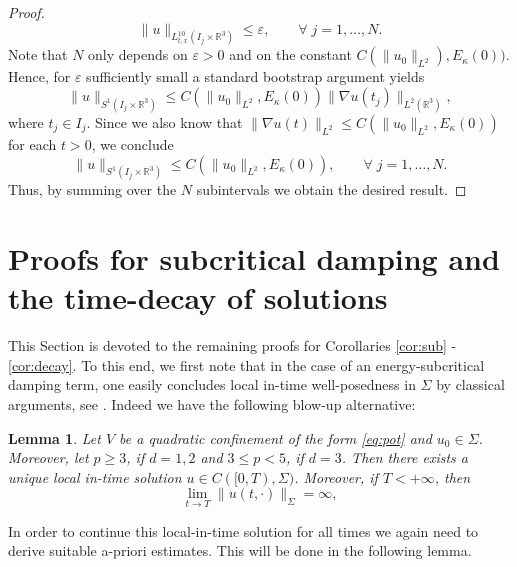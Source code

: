 \documentclass[a4paper,leqno]{amsart}
\theoremstyle{plain}
\newtheorem{lemma}[theorem]{Lemma}
\theoremstyle{definition}
\numberwithin{equation}{section}
\begin{document}
\begin{proof}
\begin{equation*}
\|u\|_{L^{10}_{t, x}(I_j\times{{\mathbb R}}^3)}{\leqslant}{\varepsilon},\qquad\forall\;j=1,\dotsc, N.
\end{equation*}
Note that $N$ only depends on ${\varepsilon}>0$ and on the constant $C(\|u_0\|_{L^2}), E_\kappa(0))$. Hence, for ${\varepsilon}$ sufficiently small a standard bootstrap argument yields 
\begin{equation*}
\|u\|_{S^1(I_j\times{{\mathbb R}}^3)}{\leqslant} C(\|u_0\|_{L^2}, E_\kappa(0))\|\nabla u(t_j)\|_{L^2({{\mathbb R}}^3)},
\end{equation*}
where $t_j\in I_j$. Since we also know that $\|\nabla u(t)\|_{L^2}{\leqslant} C(\|u_0\|_{L^2}, E_\kappa(0))$ for each $t>0$, we conclude
\begin{equation*}
\|u\|_{S^1(I_j\times{{\mathbb R}}^3)}{\leqslant} C(\|u_0\|_{L^2}, E_\kappa(0)),\qquad\forall\;j=1,\dotsc,N.
\end{equation*}
Thus, by summing over the $N$ subintervals we obtain the desired result.
\end{proof}
\section{Proofs for subcritical damping and the time-decay of solutions}\label{sec:sub}

This Section is devoted to the remaining proofs for Corollaries \ref{cor:sub} - \ref{cor:decay}.
To this end, we first note that in the case of an energy-subcritical damping term, one easily concludes 
local in-time well-posedness in $\Sigma$ by
classical arguments, see \cite{Caz, T, Car1, Car2, Zh}. Indeed we have the following blow-up alternative:

\begin{lemma} \label{lem:blow-up} Let $V$ be a quadratic confinement of the form \eqref{eq:pot} and $u_0 \in \Sigma$.
Moreover, let $p{\geqslant} 3$, if $d=1,2$ and $3{\leqslant} p< 5$, if $d=3$. Then there exists a unique local in-time solution
$u \in C([0, T), \Sigma)$. Moreover, if $T< + \infty$, then 
$$\lim_{t \to T} \| u (t, \cdot) \|_{\Sigma} = \infty,$$
\end{lemma}
In order to continue this local-in-time solution for all times we again need to derive suitable a-priori estimates. This will be done in the following lemma.
\end{document}
